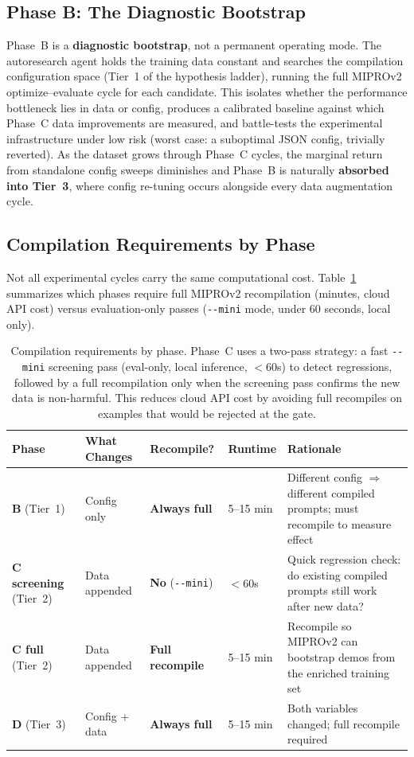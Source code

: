 \documentclass[11pt]{article}
\begin{document}
\subsection{Phase B: The Diagnostic Bootstrap}

Phase~B is a \textbf{diagnostic bootstrap}, not a permanent operating mode.
The autoresearch agent holds the training data constant and searches the
compilation configuration space (Tier~1 of the hypothesis ladder), running
the full MIPROv2 optimize--evaluate cycle for each candidate. This isolates
whether the performance bottleneck lies in data or config, produces a
calibrated baseline against which Phase~C data improvements are measured,
and battle-tests the experimental infrastructure under low risk (worst case:
a suboptimal JSON config, trivially reverted). As the dataset grows through
Phase~C cycles, the marginal return from standalone config sweeps diminishes
and Phase~B is naturally \textbf{absorbed into Tier~3}, where config
re-tuning occurs alongside every data augmentation cycle.

\subsection{Compilation Requirements by Phase}

Not all experimental cycles carry the same computational cost.
Table~\ref{tab:compile_reqs} summarizes which phases require full
MIPROv2 recompilation (minutes, cloud API cost) versus evaluation-only
passes (\texttt{-{}-mini} mode, under 60 seconds, local only).

\begin{table}[h!]
\centering
\small
\begin{tabular}{@{}llllp{4.8cm}@{}}
\toprule
Phase & What Changes & Recompile? & Runtime & Rationale \\
\midrule
\textbf{B} (Tier~1) & Config only &
  \textbf{Always full} & 5--15 min &
  Different config $\Rightarrow$ different compiled prompts; must recompile to measure effect \\[4pt]
\textbf{C screening} (Tier~2) & Data appended &
  \textbf{No} (\texttt{-{}-mini}) & $<$60s &
  Quick regression check: do existing compiled prompts still work after new data? \\[4pt]
\textbf{C full} (Tier~2) & Data appended &
  \textbf{Full recompile} & 5--15 min &
  Recompile so MIPROv2 can bootstrap demos from the enriched training set \\[4pt]
\textbf{D} (Tier~3) & Config + data &
  \textbf{Always full} & 5--15 min &
  Both variables changed; full recompile required \\
\bottomrule
\end{tabular}
\caption{Compilation requirements by phase. Phase~C uses a two-pass
strategy: a fast \texttt{-{}-mini} screening pass (eval-only, local inference,
$<$60s) to detect regressions, followed by a full recompilation only
when the screening pass confirms the new data is non-harmful. This
reduces cloud API cost by avoiding full recompiles on examples that
would be rejected at the gate.}
\label{tab:compile_reqs}
\end{table}
\end{document}
